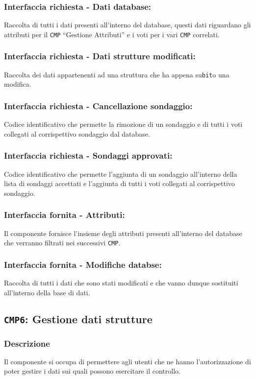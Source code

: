         \subsubsection{Interfaccia richiesta - Dati database:}
            Raccolta di tutti i dati presenti all'interno del database, questi dati riguardano gli attributi per il \texttt{CMP} ``Gestione Attributi'' e i voti per i vari \texttt{CMP} correlati.
        \subsubsection{Interfaccia richiesta - Dati strutture modificati:}
            Raccolta dei dati appartenenti ad una struttura che ha appena su\texttt{bit}o una modifica.
        \subsubsection{Interfaccia richiesta - Cancellazione sondaggio:}
            Codice identificativo che permette la rimozione di un sondaggio e di tutti i voti collegati al corrispettivo sondaggio dal database.
        \subsubsection{Interfaccia richiesta - Sondaggi approvati:}
            Codice identificativo che permette l'aggiunta di un sondaggio all'interno della lista di sondaggi accettati e l'aggiunta di tutti i voti collegati al corrispettivo sondaggio.
        \subsubsection{Interfaccia fornita - Attributi:}
            Il componente fornisce l'insieme degli attributi presenti all'interno del database che verranno filtrati nei successivi \texttt{CMP}.
        \subsubsection{Interfaccia fornita - Modifiche databse:}
            Raccolta di tutti i dati che sono stati modificati e che vanno dunque sostituiti all'interno della base di dati.
    
    \subsection{\texttt{CMP6}: Gestione dati strutture}
        \subsubsection{Descrizione}
            Il componente si occupa di permettere agli utenti che ne hanno l'autorizzazione di poter gestire i dati sui quali possono esercitare il controllo.
